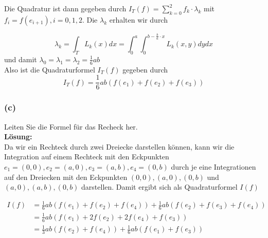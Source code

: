 \documentclass[11pt,a4paper,ngerman]{article}
\begin{document}
%
%

Die Quadratur ist dann gegeben durch $I_T(f) = \sum_{k=0}^2 f_k \cdot \lambda_k$ mit $f_i = f(e_{i+1}), i = 0,1,2$. Die $\lambda_k$ erhalten wir durch

\begin{equation*}
\lambda_k = \int_T L_k(x) dx = \int_0^a \int_0^{b-\frac{b}{a}\cdot x} L_k(x,y) dy dx
\end{equation*}
und damit
$\lambda_0 = \lambda_1 = \lambda_2 = \frac{1}{6} ab$ \\
Also ist die Quadraturformel $I_T(f)$ gegeben durch
\begin{equation*}
I_T(f) =  \frac{1}{6} ab \left( f(e_1) + f(e_2) + f(e_3) \right)
\end{equation*}

\subsubsection*{(c)}
Leiten Sie die Formel für das Recheck her.\\

\textbf{Lösung:}\\
Da wir ein Rechteck durch zwei Dreiecke darstellen können, kann wir die Integration auf einem Rechteck mit den Eckpunkten $e_1 = (0,0), e_2 = (a,0), e_3 = (a,b), e_4 = (0,b)$ durch
je eine Integrationen auf den Dreiecken mit den Eckpunkten $(0,0),(a,0),(0,b)$ und $(a,0),(a,b),(0,b)$ darstellen.
Damit ergibt sich als Quadraturformel $I(f)$

\begin{equation*}\begin{split}
I(f) &=  \frac{1}{6} ab \left( f(e_1) + f(e_2) + f(e_4) \right) +  \frac{1}{6} ab \left( f(e_2) + f(e_3) + f(e_4) \right) \\
&=  \frac{1}{6} ab \left(f(e_1) + 2f(e_2) + 2f(e_4) + f(e_3) \right)  \\
&= \frac{1}{3} ab \left( f(e_2) + f(e_4) \right) +  \frac{1}{6} ab \left(f(e_1) +  f(e_3) \right)
\end{split}\end{equation*}


\label{LastPage}
\end{document}
